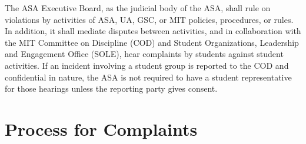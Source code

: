 \documentclass[12pt]{article}
\begin{document}
\newpage

The ASA Executive Board, as the judicial body of the ASA, shall rule on violations by activities of ASA,
UA, GSC, or MIT policies, procedures, or rules. In addition, it shall mediate disputes between activities,
and in collaboration with the MIT Committee on Discipline (COD) and Student Organizations,
Leadership and Engagement Office (SOLE), hear complaints by students against student activities. If an
incident involving a student group is reported to the COD and confidential in nature, the ASA is not
required to have a student representative for those hearings unless the reporting party gives consent.


\section{Process for Complaints}
\label{art:V_sect1}
\end{document}
